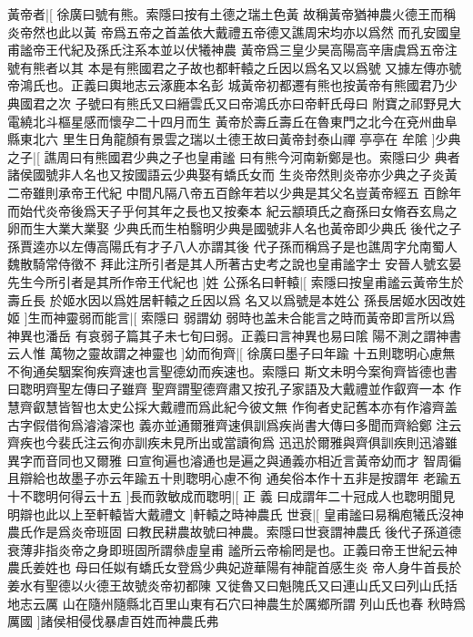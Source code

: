黃帝者|[%
徐廣曰號有熊。索隱曰按有土德之瑞土色黃%
故稱黃帝猶神農火德王而稱炎帝然也此以黃%
%
帝爲五帝之首盖依大戴禮五帝德又譙周宋均亦以爲然%
而孔安國皇甫謐帝王代紀及孫氏注系本並以伏犧神農%
%
黃帝爲三皇少昊高陽高辛唐虞爲五帝注號有熊者以其%
本是有熊國君之子故也都軒轅之丘因以爲名又以爲號%
%
又據左傳亦號帝鴻氏也。正義曰輿地志云涿鹿本名彭%
城黃帝初都遷有熊也按黃帝有熊國君乃少典國君之次%
%
子號曰有熊氏又曰縉雲氏又曰帝鴻氏亦曰帝軒氏母曰%
附寶之祁野見大電繞北斗樞星感而懷孕二十四月而生%
%
黃帝於壽丘壽丘在魯東門之北今在兗州曲阜縣東北六%
里生日角龍顏有景雲之瑞以土德王故曰黃帝封泰山禪%
%
亭亭在%
牟隂%
]少典之子|[%
譙周曰有熊國君少典之子也皇甫謐%
曰有熊今河南新鄭是也。索隱曰少%
%
典者諸侯國號非人名也又按國語云少典娶有蟜氏女而%
生炎帝然則炎帝亦少典之子炎黃二帝雖則承帝王代紀%
%
中間凡隔八帝五百餘年若以少典是其父名豈黃帝經五%
百餘年而始代炎帝後爲天子乎何其年之長也又按秦本%
%
紀云顓頊氏之裔孫曰女脩吞玄鳥之卵而生大業大業娶%
少典氏而生柏翳明少典是國號非人名也黃帝即少典氏%
%
後代之子孫賈逵亦以左傳高陽氏有才子八人亦謂其後%
代子孫而稱爲子是也譙周字允南蜀人魏散騎常侍徵不%
%
拜此注所引者是其人所著古史考之說也皇甫謐字士%
安晉人號玄晏先生今所引者是其所作帝王代紀也%
]姓%
%
公孫名曰軒轅|[%
索隱曰按皇甫謐云黃帝生於壽丘長%
於姬水因以爲姓居軒轅之丘因以爲%
%
名又以爲號是本姓公%
孫長居姬水因改姓姬%
]生而神靈弱而能言|[%
索隱曰%
弱謂幼%
%
弱時也盖未合能言之時而黃帝即言所以爲神異也潘岳%
有哀弱子篇其子未七旬曰弱。正義曰言神異也易曰隂%
%
陽不測之謂神書云人惟%
萬物之靈故謂之神靈也%
]幼而徇齊|[%
徐廣曰墨子曰年踰%
十五則聦明心慮無%
%
不徇通矣駰案徇疾齊速也言聖德幼而疾速也。索隱曰%
斯文未明今案徇齊皆德也書曰聦明齊聖左傳曰子雖齊%
%
聖齊謂聖德齊肅又按孔子家語及大戴禮並作叡齊一本%
作慧齊叡慧皆智也太史公採大戴禮而爲此紀今彼文無%
%
作徇者史記舊本亦有作濬齊盖古字假借徇爲濬濬深也%
義亦並通爾雅齊速俱訓爲疾尚書大傳曰多聞而齊給鄭%
%
注云齊疾也今裴氏注云徇亦訓疾未見所出或當讀徇爲%
迅迅於爾雅與齊俱訓疾則迅濬雖異字而音同也又爾雅%
%
曰宣徇遍也濬通也是遍之與通義亦相近言黃帝幼而才%
智周徧且辯給也故墨子亦云年踰五十則聦明心慮不徇%
%
通矣俗本作十五非是按謂年%
老踰五十不聦明何得云十五%
]長而敦敏成而聦明|[%
正%
義%
%
曰成謂年二十冠成人也聦明聞見%
明辯也此以上至軒轅皆大戴禮文%
]軒轅之時神農氏%
%
世衰|[%
皇甫謐曰易稱庖犧氏沒神農氏作是爲炎帝班固%
曰教民耕農故號曰神農。索隱曰世衰謂神農氏%
%
後代子孫道德衰薄非指炎帝之身即班固所謂叅虛皇甫%
謐所云帝榆罔是也。正義曰帝王世紀云神農氏姜姓也%
%
母曰任姒有蟜氏女登爲少典妃遊華陽有神龍首感生炎%
帝人身牛首長於姜水有聖德以火德王故號炎帝初都陳%
%
又徙魯又曰魁隗氏又曰連山氏又曰列山氏括地志云厲%
山在隨州隨縣北百里山東有石穴曰神農生於厲鄉所謂%
%
列山氏也春%
秋時爲厲國%
]諸侯相侵伐暴虐百姓而神農氏弗%
